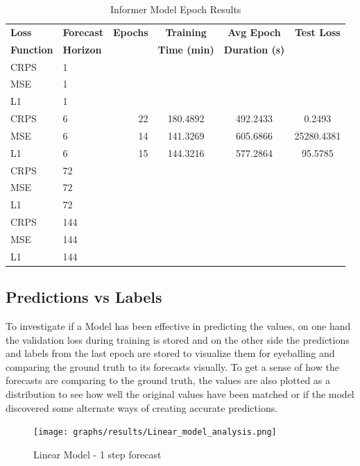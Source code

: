 \documentclass{article}
\begin{document}
\begin{table}
    \footnotesize
    \centering
    \caption{Informer Model Epoch Results}
    \begin{tabular}{l|l|r|S|S|S}
        \toprule
        \textbf{Loss} & \textbf{Forecast} & \textbf{Epochs} & \textbf{Training} & \textbf{Avg Epoch} & \textbf{Test Loss} \\
        \textbf{Function} & \textbf{Horizon} & & \textbf{Time (min)} & \textbf{Duration (s)} & \\
        \midrule
            CRPS & 1 &  &  &  &  \\
        MSE & 1 &  &  &  &  \\
        L1 & 1 &  &  &  &  \\
        \midrule
        CRPS & 6 & 22 & 180.4892 & 492.2433 & 0.2493 \\
        MSE & 6 & 14 & 141.3269 & 605.6866 & 25280.4381 \\
        L1 & 6 & 15 & 144.3216 & 577.2864 & 95.5785 \\
        \midrule
        CRPS & 72 &  &  &  &  \\
        MSE & 72 &  &  &  &  \\
        L1 & 72 &  &  &  &  \\
        \midrule
        CRPS & 144 &  &  &  &  \\
        MSE & 144 &  &  &  &  \\
        L1 & 144 &  &  &  &  \\
    \bottomrule
    \end{tabular}
    \label{tab:informer_epoch}
\end{table}

\subsection{Predictions vs Labels}

To investigate if a Model has been effective in predicting the values, on one hand the validation loss during training is stored and on the other side the predictions and labels from the last epoch are stored to visualize them for eyeballing and comparing the ground truth to its forecasts visually. To get a sense of how the forecasts are comparing to the ground truth, the values are also plotted as a distribution to see how well the original values have been matched or if the model discovered some alternate ways of creating accurate predictions. 

\begin{figure}
    \centering
    \texttt{[image: graphs/results/Linear\_model\_analysis.png]}
    \caption{Linear Model - 1 step forecast}
    \label{fig:Linear_f1}
\end{figure}
\end{document}
